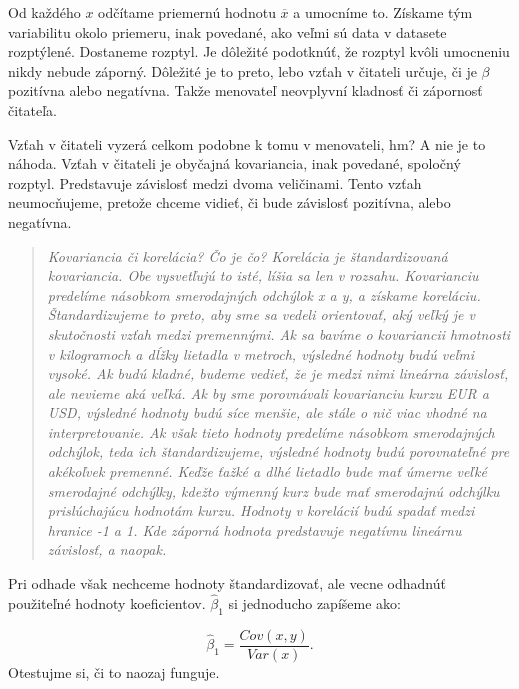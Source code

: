 Od každého \(x\) odčítame priemernú hodnotu \(\overline{x}\) a umocníme
to. Získame tým variabilitu okolo priemeru, inak povedané, ako veľmi sú
data v datasete rozptýlené. Dostaneme rozptyl. Je dôležité podotknúť, že
rozptyl kvôli umocneniu nikdy nebude záporný. Dôležité je to preto, lebo
vzťah v čitateli určuje, či je \(\beta\) pozitívna alebo negatívna.
Takže menovateľ neovplyvní kladnosť či zápornosť čitateľa.

Vzťah v čitateli vyzerá celkom podobne k tomu v menovateli, hm? A nie je
to náhoda. Vzťah v čitateli je obyčajná kovariancia, inak povedané,
spoločný rozptyl. Predstavuje závislosť medzi dvoma veličinami. Tento
vzťah neumocňujeme, pretože chceme vidieť, či bude závislosť pozitívna,
alebo negatívna.

\begin{quote}
\emph{Kovariancia či korelácia? Čo je čo? Korelácia je štandardizovaná
kovariancia. Obe vysvetľujú to isté, líšia sa len v rozsahu. Kovarianciu
predelíme násobkom smerodajných odchýlok x a y, a získame koreláciu.
Štandardizujeme to preto, aby sme sa vedeli orientovať, aký veľký je v
skutočnosti vzťah medzi premennými. Ak sa bavíme o kovariancii hmotnosti
v kilogramoch a dĺžky lietadla v metroch, výsledné hodnoty budú veľmi
vysoké. Ak budú kladné, budeme vedieť, že je medzi nimi lineárna
závislosť, ale nevieme aká veľká. Ak by sme porovnávali kovarianciu
kurzu EUR a USD, výsledné hodnoty budú síce menšie, ale stále o nič viac
vhodné na interpretovanie. Ak však tieto hodnoty predelíme násobkom
smerodajných odchýlok, teda ich štandardizujeme, výsledné hodnoty budú
porovnateľné pre akékoľvek premenné. Keďže ťažké a dlhé lietadlo bude
mať úmerne veľké smerodajné odchýlky, kdežto výmenný kurz bude mať
smerodajnú odchýlku prislúchajúcu hodnotám kurzu. Hodnoty v korelácií
budú spadať medzi hranice -1 a 1. Kde záporná hodnota predstavuje
negatívnu lineárnu závislosť, a naopak.}
\end{quote}

Pri odhade však nechceme hodnoty štandardizovať, ale vecne odhadnúť
použiteľné hodnoty koeficientov. \(\hat\beta_1\) si jednoducho zapíšeme
ako:

\[\hat\beta_1 = \frac{Cov(x, y)}{Var(x)}.\] Otestujme si, či to naozaj
funguje.

\begin{Shaded}
\begin{Highlighting}[]

\end{Highlighting}
\end{Shaded}

